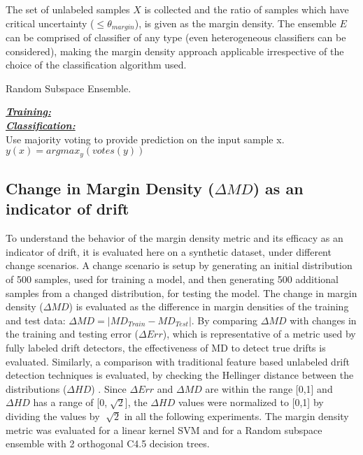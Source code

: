 \documentclass[authoryear,3p,times,twocolumn]{elsarticle}
\begin{document}
The set of unlabeled samples $X$ is collected and the ratio of samples which have critical uncertainty ($\leq \theta_{margin}$), is given as the margin density. The ensemble $E$ can be comprised of classifier of any type (even heterogeneous classifiers can be considered), making the margin density approach applicable irrespective of the choice of the classification algorithm used. 


{\LinesNotNumbered
\begin{algorithm}[t]
\caption {Random Subspace Ensemble.}
\label{algo:rs}
\underline{\textit{\textbf{Training:}}} \\
\underline{\textit{\textbf{Classification:}}}\\
   Use majority voting to provide prediction on the input sample x. $y(x)=argmax_y(votes(y))$
\end{algorithm}}



\subsection{Change in Margin Density ($\Delta MD$) as an indicator of drift}
\label{sec:proofofconcept}

To understand the behavior of the margin density metric and its efficacy as an indicator of drift, it is evaluated here on a synthetic dataset, under different change scenarios. A change scenario is setup by generating an initial distribution of 500 samples, used for training a model, and then generating 500 additional samples from a changed distribution, for testing the model. The change in margin density ($\Delta MD$) is evaluated as the difference in margin densities of the training and test data: $\Delta MD=|MD_{Train}-MD_{Test}|$. By comparing $\Delta MD$ with changes in the training and testing error ($\Delta Err$), which is representative of a metric used by fully labeled drift detectors, the effectiveness of MD to detect true drifts is evaluated. Similarly, a comparison with traditional feature based unlabeled drift detection techniques is evaluated, by checking the Hellinger distance between the distributions ($\Delta HD$) \citep{ditzler2011hellinger}. Since $\Delta Err$ and $\Delta MD$ are within the range [0,1] and $\Delta HD$ has a range of [0,$\sqrt[]{2}$], the $\Delta HD$ values were normalized to [0,1] by dividing the values by $\sqrt[]{2}$ in all the following experiments. The margin density metric was evaluated for a linear kernel SVM and for a Random subspace ensemble with 2 orthogonal C4.5 decision trees. 
\end{document}
